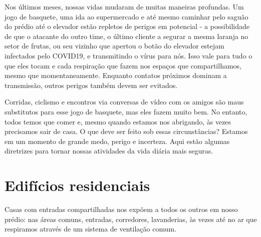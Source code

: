 \documentclass[onecolumn,journal]{IEEEtran}
\begin{document}
\begin{multicols}{2}

Nos últimos meses, nossas vidas mudaram de muitas maneiras profundas. Um jogo de basquete, uma ida ao supermercado e até mesmo caminhar pelo saguão do prédio até o elevador estão repletos de perigos em potencial - a possibilidade de que o atacante do outro time, o último cliente a segurar a mesma laranja no setor de frutas, ou seu vizinho que apertou o botão do elevador estejam infectados pelo COVID19, e transmitindo o vírus para nós. Isso vale para tudo o que eles tocam e cada respiração que fazem nos espaços que compartilhamos, mesmo que momentaneamente. Enquanto contatos próximos dominam a transmissão, outros perigos também devem ser evitados.

Corridas, ciclismo e encontros via conversas de vídeo com os amigos são maus substitutos para esse jogo de basquete, mas eles fazem muito bem. No entanto, todos temos que comer e, mesmo quando estamos nos abrigando, às vezes precisamos sair de casa. O que deve ser feito sob essas circunstâncias? Estamos em um momento de grande medo, perigo e incerteza. Aqui estão algumas diretrizes para tornar nossas atividades da vida diária mais seguras.

\section*{Edifícios residenciais}

Casas com entradas compartilhadas nos expõem a todos os outros em nosso prédio: nas áreas comuns, entradas, corredores, lavanderias, às vezes até no ar que respiramos através de um sistema de ventilação comum.

\vspace{2ex}


\end{multicols}
\end{document}
